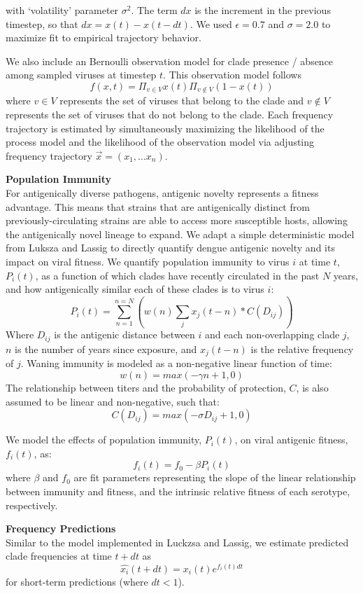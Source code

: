 \documentclass[11pt,oneside,letterpaper]{article}
\begin{document}
with ‘volatility’ parameter $\sigma^2$.
The term $dx$ is the increment in the previous timestep, so that $dx = x(t) - x(t-dt)$.
We used $\epsilon = 0.7$ and $\sigma = 2.0$ to maximize fit to empirical trajectory behavior.

We also include an Bernoulli observation model for clade presence / absence among sampled viruses at timestep $t$.
This observation model follows
$$f(x,t) = \Pi_{v \in V} x(t) \Pi_{v \notin V} (1-x(t))$$
where $v \in V$ represents the set of viruses that belong to the clade and $v \notin V$ represents the set of viruses that do not belong to the clade.
Each frequency trajectory is estimated by simultaneously
maximizing the likelihood of the process model and the likelihood
of the observation model via adjusting frequency trajectory $\vec{x} = (x_1, ... x_n)$.

\textbf{Population Immunity}\\
For antigenically diverse pathogens, antigenic novelty represents a fitness advantage.
This means that strains that are antigenically distinct from previously-circulating strains are able to access more susceptible hosts, allowing the antigenically novel lineage to expand.
We adapt a simple deterministic model from Luksza and Lassig to directly quantify dengue antigenic novelty and its impact on viral fitness.
We quantify population immunity to virus $i$ at time $t$, $P_i(t)$, as a function of which clades have recently circulated in the past $N$ years, and how antigenically similar each of these clades is to virus $i$:
$$P_i(t) = \sum_{n=1}^{n=N} (w(n)  \sum_{j} x_j(t-n) * C( D_{ij}))$$
Where $D_{ij}$ is the antigenic distance between $i$ and each non-overlapping clade $j$, $n$ is the number of years since exposure, and $x_j(t-n)$ is the relative frequency of $j$.
Waning immunity is modeled as a non-negative linear function of time:
$$w(n) = max(-\gamma n + 1, 0)$$
The relationship between titers and the probability of protection, $C$, is also assumed to be linear and non-negative, such that:
$$C(D_{ij}) = max(-\sigma D_{ij} + 1, 0)$$

We model the effects of population immunity, $P_i(t)$, on viral antigenic fitness, $f_i(t)$, as:
$$f_i(t) = f_0-\beta P_i(t)$$
where $\beta$ and $f_0$ are fit parameters representing the slope of the linear relationship between immunity and fitness, and the intrinsic relative fitness of each serotype, respectively.

\textbf{Frequency Predictions}\\
Similar to the model implemented in Luckzsa and Lassig, we estimate predicted clade frequencies at time $t + dt$ as
$$\hat{x_i}(t+dt) = x_i(t) e^{f_i(t) dt}$$
for short-term predictions (where $dt < 1$).
\end{document}
